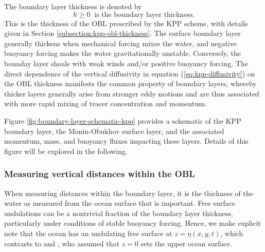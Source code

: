 The boundary layer thickness is denoted by 
\begin{equation}
 h \ge 0 \; \; \mbox{is the boundary layer thickness}.
\label{eq:boundary-layer-thickness}
\end{equation}
This is the thickness of the OBL prescribed by the KPP scheme, with
details given in Section \ref{subsection:kpp-obl-thickness}.  The
surface boundary layer generally thickens when mechanical forcing
mixes the water, and negative buoyancy forcing makes the water
gravitationally unstable.  Conversely, the bounday layer shoals with
weak winds and/or positive buoyancy forcing.  The direct dependence of
the vertical diffusivity in equation (\ref{eq:kpp-diffusivity}) on the
OBL thickness manifests the common property of boundary layers,
whereby thicker layers generally arise from stronger eddy motions and
are thus associated with more rapid mixing of tracer concentration and
momentum.

Figure \ref{fig:boundary-layer-schematic-kpp} provides a schematic of
the KPP boundary layer, the Monin-Obukhov surface layer, and the
associated momentum, mass, and buoyancy fluxes impacting these layers.
Details of this figure will be explored in the following.



\subsubsection{Measuring vertical distances within the OBL}

When measuring distances within the boundary layer, it is the
thickness of the water as measured from the ocean surface that is
important. Free surface undulations can be a nontrivial fraction of
the boundary layer thickness, particularly under conditions of stable
buoyancy forcing. Hence, we make explicit note that the ocean has an
undulating free surface at $z=\eta(x,y,t)$, which contrasts to
\cite{LargeKPP} and \cite{LargeKPP_lectures}, who assumed that $z=0$
sets the upper ocean surface.

